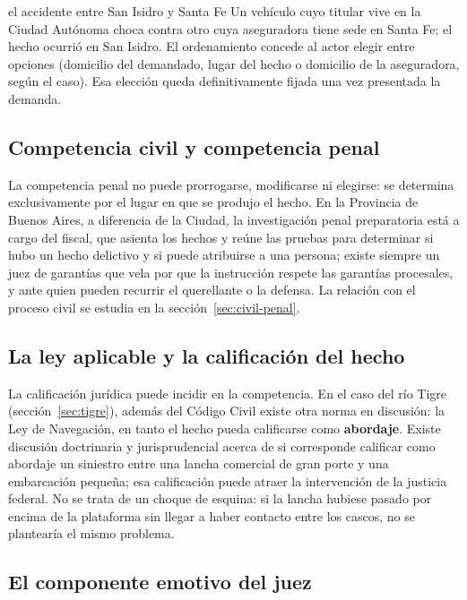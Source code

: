 \documentclass[12pt,oneside]{book}
\begin{document}
\begin{ejemplo}{el accidente entre San Isidro y Santa Fe}
Un vehículo cuyo titular vive en la Ciudad Autónoma choca contra otro cuya aseguradora tiene sede en Santa Fe; el hecho ocurrió en San Isidro. El ordenamiento concede al actor elegir entre opciones (domicilio del demandado, lugar del hecho o domicilio de la aseguradora, según el caso). Esa elección queda definitivamente fijada una vez presentada la demanda.
\end{ejemplo}

\subsection{Competencia civil y competencia penal}

La competencia penal no puede prorrogarse, modificarse ni elegirse: se determina exclusivamente por el lugar en que se produjo el hecho. En la Provincia de Buenos Aires, a diferencia de la Ciudad, la investigación penal preparatoria está a cargo del fiscal, que asienta los hechos y reúne las pruebas para determinar si hubo un hecho delictivo y si puede atribuirse a una persona; existe siempre un juez de garantías que vela por que la instrucción respete las garantías procesales, y ante quien pueden recurrir el querellante o la defensa. La relación con el proceso civil se estudia en la sección~\ref{sec:civil-penal}.

\subsection{La ley aplicable y la calificación del hecho}

La calificación jurídica puede incidir en la competencia. En el caso del río Tigre (sección~\ref{sec:tigre}), además del Código Civil existe otra norma en discusión: la Ley de Navegación, en tanto el hecho pueda calificarse como \textbf{abordaje}. Existe discusión doctrinaria y jurisprudencial acerca de si corresponde calificar como abordaje un siniestro entre una lancha comercial de gran porte y una embarcación pequeña; esa calificación puede atraer la intervención de la justicia federal. No se trata de un choque de esquina: si la lancha hubiese pasado por encima de la plataforma sin llegar a haber contacto entre los cascos, no se plantearía el mismo problema.

\subsection{El componente emotivo del juez}\label{sec:emotivo-fuero}
\end{document}

